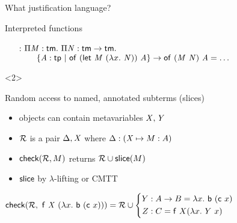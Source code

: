 \documentclass{beamer}
\theoremstyle{example}
\begin{document}
\begin{frame}{What justification language?}
\begin{overlayarea}
\begin{onlyenv}
\begin{block}{Interpreted functions}
\begin{example}
\begin{enumerate}[inline]
          \item[\const{inline} :] $\Pi{\ensuremath{\text{\textit{M}}}}:{\text{\textsf{tm}}}.\  \Pi{\ensuremath{\text{\textit{N}}}}:{\text{\textsf{tm}}\to\text{\textsf{tm}}}.\  $\\ $\qquad \{{\text{\textit{A}}}:{\text{\textsf{tp}}}\ |\ {{\text{\textsf{of}}}\  {(\text{\textsf{let}}\ {\text{\textit{M}}}\ {(\lambda{x}.\  \text{\textit{N}})})}\  {\text{\textit{A}}}}\} \to
            {\ensuremath{\text{\textsf{of}}}}\  {({\text{\textit{M}}}\  {\text{\textit{N}}})}\  {\text{\textit{A}}} =
            \ldots$
          \end{enumerate}
        \end{example}
      \end{block}
    \end{onlyenv}
    \begin{onlyenv}<2>
      \begin{block}
        {Random access} to named, annotated subterms (slices) \\
        \begin{itemize}
        \item objects can contain metavariables $\text{\textit{X}}, \text{\textit{Y}}$
        \item $\mathcal{R}$ is a pair $\Delta, \text{\textit{X}}$ where $\Delta :
          (\text{\textit{X}}\mapsto M : A)$
        \item ${\rm\mathsf{check}}({\mathcal{R}, M})$ returns $\mathcal{R} \cup {\rm\mathsf{slice}}({M})$
        \item ${\rm\mathsf{slice}}$ by $\lambda$-lifting or CMTT
        \end{itemize}
        \begin{example}
          \begin{math}
            {\rm\mathsf{check}}({\mathcal{R},\ \text{\textsf{f}}\ \text{\textit{X}}\ (\lambda{x}.\  \text{\textsf{b}}\ (\text{\textsf{c}}\ x))}) = \mathcal{R} \cup \left\{
              \begin{aligned}
                Y &: A\to B = \lambda{x}.\  \text{\textsf{b}}\ (\text{\textsf{c}}\ x) \\
                Z &: C = \text{\textsf{f}}\ X (\lambda{x}.\  Y\ x)
              \end{aligned}
            \right.
          \end{math}
        \end{example}
      \end{block}
      \end{onlyenv}
    \end{overlayarea}

\end{frame}
\end{document}
